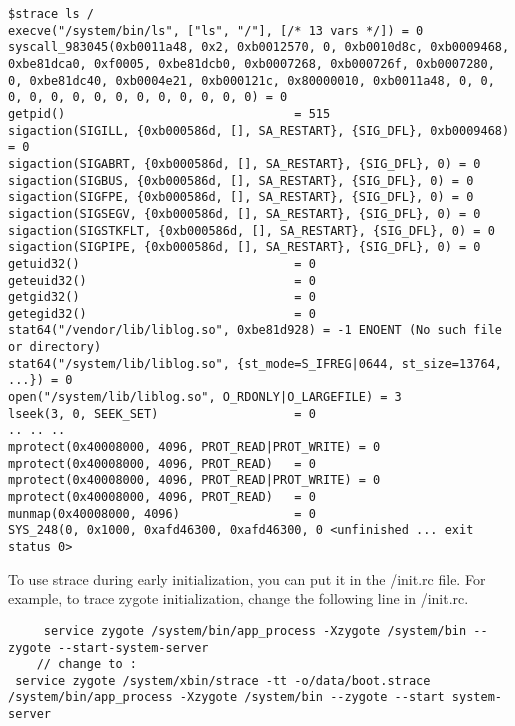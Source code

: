 \documentclass[a4paper,titlepage]{article}
\begin{document}
\begin{lstlisting}
$strace ls /
execve("/system/bin/ls", ["ls", "/"], [/* 13 vars */]) = 0
syscall_983045(0xb0011a48, 0x2, 0xb0012570, 0, 0xb0010d8c, 0xb0009468, 0xbe81dca0, 0xf0005, 0xbe81dcb0, 0xb0007268, 0xb000726f, 0xb0007280, 0, 0xbe81dc40, 0xb0004e21, 0xb000121c, 0x80000010, 0xb0011a48, 0, 0, 0, 0, 0, 0, 0, 0, 0, 0, 0, 0, 0, 0) = 0
getpid()                                = 515
sigaction(SIGILL, {0xb000586d, [], SA_RESTART}, {SIG_DFL}, 0xb0009468) = 0
sigaction(SIGABRT, {0xb000586d, [], SA_RESTART}, {SIG_DFL}, 0) = 0
sigaction(SIGBUS, {0xb000586d, [], SA_RESTART}, {SIG_DFL}, 0) = 0
sigaction(SIGFPE, {0xb000586d, [], SA_RESTART}, {SIG_DFL}, 0) = 0
sigaction(SIGSEGV, {0xb000586d, [], SA_RESTART}, {SIG_DFL}, 0) = 0
sigaction(SIGSTKFLT, {0xb000586d, [], SA_RESTART}, {SIG_DFL}, 0) = 0
sigaction(SIGPIPE, {0xb000586d, [], SA_RESTART}, {SIG_DFL}, 0) = 0
getuid32()                              = 0
geteuid32()                             = 0
getgid32()                              = 0
getegid32()                             = 0
stat64("/vendor/lib/liblog.so", 0xbe81d928) = -1 ENOENT (No such file or directory)
stat64("/system/lib/liblog.so", {st_mode=S_IFREG|0644, st_size=13764, ...}) = 0
open("/system/lib/liblog.so", O_RDONLY|O_LARGEFILE) = 3
lseek(3, 0, SEEK_SET)                   = 0
.. .. ..
mprotect(0x40008000, 4096, PROT_READ|PROT_WRITE) = 0
mprotect(0x40008000, 4096, PROT_READ)   = 0
mprotect(0x40008000, 4096, PROT_READ|PROT_WRITE) = 0
mprotect(0x40008000, 4096, PROT_READ)   = 0
munmap(0x40008000, 4096)                = 0
SYS_248(0, 0x1000, 0xafd46300, 0xafd46300, 0 <unfinished ... exit status 0>

\end{lstlisting}

To use strace during early initialization, you can put it in the /init.rc file. For example, to trace zygote initialization, change the following line in /init.rc.
 \begin{lstlisting}
     service zygote /system/bin/app_process -Xzygote /system/bin --zygote --start-system-server 
    // change to :
 service zygote /system/xbin/strace -tt -o/data/boot.strace /system/bin/app_process -Xzygote /system/bin --zygote --start system-server

 \end{lstlisting}
\end{document}
